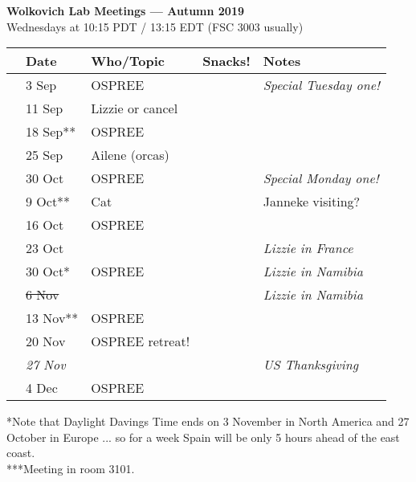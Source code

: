 \documentclass[11pt]{article}
\begin{document}
 
\raggedright
{}

\begin{center} 
{\large \textbf{Wolkovich Lab Meetings --- Autumn 2019}} \\ [2pt]
Wednesdays at 10:15 PDT / 13:15 EDT (FSC 3003 usually)\\
\end{center} 

\begin{center}
\begin{tabular}{ p{0.2 cm}  p{2 cm}  p{5 cm}  p{2 cm}  p{4 cm} }  \hline \hline
 & \textbf{Date}
   & \textbf{Who/Topic}
      & \textbf{Snacks!} 
         & \textbf{Notes} \\ 
\hline \hline
 & 3 Sep & OSPREE &       &  \emph{Special Tuesday one!}\\\hline
 & 11 Sep & Lizzie or cancel&       &  \\\hline
 & 18 Sep** & OSPREE &       & \\\hline  
 & 25 Sep & Ailene (orcas) &       &  \\\hline
 & 30 Oct & OSPREE &       &  \emph{Special Monday one!}\\\hline
 & 9 Oct** & Cat &     & Janneke visiting? \\\hline
 & 16 Oct& OSPREE &       &  \\\hline %
 & 23 Oct  & &       & \emph{Lizzie in France}  \\\hline
 & 30 Oct* & OSPREE &   & \emph{Lizzie in Namibia}     \\\hline
 & \sout{6 Nov} &  &       &  \emph{Lizzie in Namibia}  \\\hline
 & 13 Nov** & OSPREE &       &  \\\hline
 & 20 Nov & OSPREE retreat!&       &  \\\hline
 & \emph{27 Nov} & &   & \emph{US Thanksgiving} \\\hline
 & 4 Dec & OSPREE &    & \\\hline


\hline
\end{tabular}
\end{center}
*Note that Daylight Davings Time ends on 3 November in North America and 27 October in Europe ... so for a week Spain will be only 5 hours ahead of the east coast.\\
***Meeting in room 3101.
\vspace{10pt}\\
\end{document}
